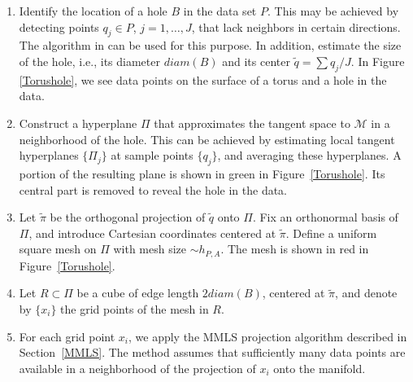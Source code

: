 \documentclass[11pt,oneside,reqno]{amsart}
\theoremstyle{plain}
\numberwithin{equation}{section}
\begin{document}
\medskip
\begin{enumerate}
\item Identify the location of a hole $B$
in the data set $P$. 
This may be achieved 
by detecting points $q_j\in P$, 
$j=1,\ldots,J$, 
that lack neighbors 
in certain directions. 
The algorithm in \cite{Mindthegap} 
can be used for this purpose.
In addition, estimate 
the size of the hole, 
i.e., its diameter ${diam}(B)$ and its center $\tilde q=\sum q_j/J$.  In Figure \ref{Torushole}, we see data points on the surface of a torus and a hole in the data.
\item Construct a hyperplane $\Pi$ 
that approximates the tangent space 
to $\mathcal{M}$ 
in a neighborhood of the hole. 
This can be achieved 
by estimating local tangent hyperplanes 
$\{\Pi_j\}$ at sample points $\{q_j\}$, 
and averaging these hyperplanes. 
A portion of the resulting plane 
is shown in green in Figure~\ref{Torushole}. 
Its central part is removed 
to reveal the hole in the data.
\item Let $\tilde{\pi}$ be the orthogonal projection 
of $\tilde{q}$ onto $\Pi$. 
Fix an orthonormal basis of $\Pi$, 
and introduce Cartesian coordinates 
centered at $\tilde{\pi}$. 
Define 
a uniform square mesh 
on $\Pi$ with mesh size $\sim h_{P,A}$. 
The mesh is shown in red in Figure~\ref{Torushole}.

\item Let $R\subset\Pi$ be a cube 
of edge length $2{diam}(B)$, 
centered at $\tilde{\pi}$, 
and denote by $\{x_i\}$ 
the grid points of the mesh in $R$.

\item For each grid point $x_i$, 
we apply the MMLS projection algorithm 
described in Section~\ref{MMLS}. 
The method assumes 
that sufficiently many data points 
are available 
in a neighborhood of the projection 
of $x_i$ onto the manifold.


\end{enumerate}
\end{document}
